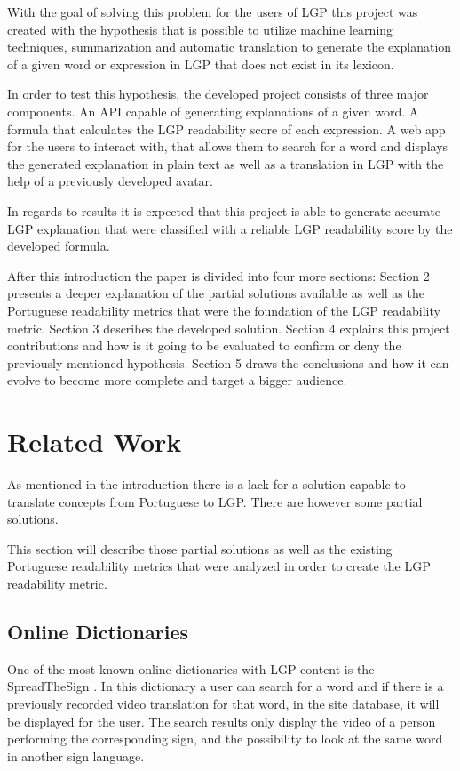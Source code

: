 \documentclass[runningheads]{llncs}
\begin{document}
With the goal of solving this problem for the users of LGP this project was created with the hypothesis that is possible to utilize machine learning techniques, summarization and automatic translation to generate the explanation of a given word or expression in LGP that does not exist in its lexicon.

In order to test this hypothesis, the developed project consists of three major components.
An API capable of generating explanations of a given word.
A formula that calculates the LGP readability score of each expression.
A web app for the users to interact with, that allows them to search for a word and displays the generated explanation in plain text as well as a translation in LGP with the help of a previously developed avatar.

In regards to results it is expected that this project is able to generate accurate LGP explanation that were classified with a reliable LGP readability score by the developed formula.

After this introduction the paper is divided into four more sections:
Section 2 presents a deeper explanation of the partial solutions available as well as the Portuguese readability metrics that were the foundation of the LGP readability metric.
Section 3 describes the developed solution.
Section 4 explains this project contributions and how is it  going to be evaluated to confirm or deny the previously mentioned hypothesis.
Section 5 draws the conclusions and how it can evolve to become more complete and target a bigger audience.

\section{Related Work}

As mentioned in the introduction there is a lack for a solution capable to translate concepts from Portuguese to LGP.
There are however some partial solutions.

This section will describe those partial solutions as well as the existing Portuguese readability metrics that were analyzed in order to create the LGP readability metric.

\subsection{Online Dictionaries}

One of the most known online dictionaries with LGP content is the SpreadTheSign \cite{sts_2020}.
In this dictionary a user can search for a word and if there is a previously recorded video translation for that word, in the site database, it will be displayed for the user.
The search results only display the video of a person performing the corresponding sign, and the possibility to look at the same word in another sign language.
\end{document}
